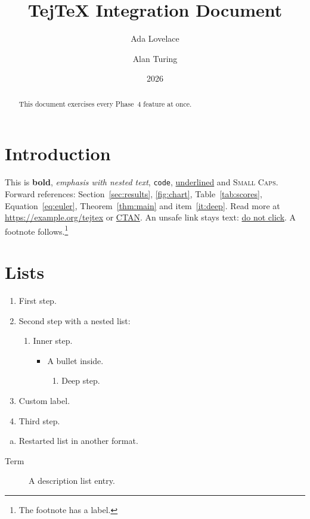 \documentclass{article}
\title{TejTeX Integration Document}
\author{Ada Lovelace \and Alan Turing}
\date{2026}
\begin{document}
\maketitle
\begin{abstract}
This document exercises every Phase~4 feature at once.
\end{abstract}

\section{Introduction}\label{sec:intro}
This is \textbf{bold}, \emph{emphasis with \emph{nested} text}, \texttt{code}, \underline{underlined} and \textsc{Small Caps}.
Forward references: Section~\ref{sec:results}, \autoref{fig:chart}, Table~\ref{tab:scores},
Equation~\eqref{eq:euler}, Theorem~\ref{thm:main} and item~\ref{it:deep}.
Read more at \url{https://example.org/tejtex} or \href{https://www.ctan.org}{CTAN}.
An unsafe link stays text: \href{javascript:alert(1)}{do not click}.
A footnote follows.\footnote{The footnote has a label.\label{fn:note}}

\section{Lists}\label{sec:lists}
\begin{enumerate}
\item First step.
\item Second step with a nested list:
  \begin{enumerate}
  \item Inner step.
    \begin{itemize}
    \item A bullet inside.
      \begin{enumerate}
      \item Deep step. \label{it:deep}
      \end{enumerate}
    \end{itemize}
  \end{enumerate}
\item[(x)] Custom label.
\item Third step.
\end{enumerate}
\begin{enumerate}[(a)]
\item Restarted list in another format.
\end{enumerate}
\begin{description}
\item[Term] A description list entry.
\end{description}
\end{document}
